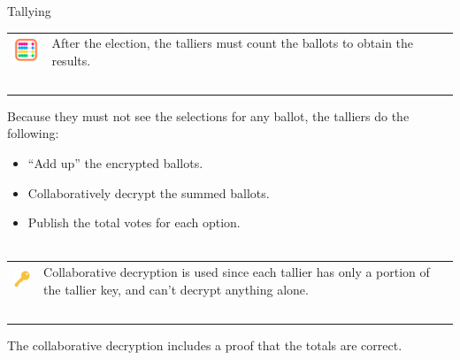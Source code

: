 \documentclass[aspectratio=169]{beamer}
\begin{document}
\begin{frame}{Tallying}
    \begin{tabular}{>{\arraybackslash}m{40px} >{\arraybackslash}m{320px}}
        \includegraphics[width=30px]{images/abacus.png} & After the election, the talliers must count the ballots to obtain the results. \\~\\
    \end{tabular}

    Because they must not see the selections for any ballot, the talliers do the following:
    \begin{itemize}
        \item ``Add up'' the encrypted ballots.
        \item Collaboratively decrypt the summed ballots.
        \item Publish the total votes for each option. \\~\\
    \end{itemize}

    \begin{tabular}{>{\arraybackslash}m{40px} >{\arraybackslash}m{320px}}
        \includegraphics[width=30px]{images/key.png} & Collaborative decryption is used since each tallier has only a portion of the tallier key, and can't decrypt anything alone. \\~\\
    \end{tabular}

    The collaborative decryption includes a proof that the totals are correct.
\end{frame}
\end{document}
